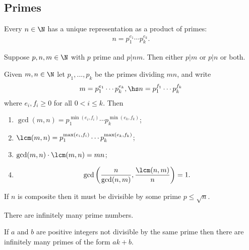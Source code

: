 \documentclass{article}
\begin{document}
\subsection{Primes}

\begin{theorem}
    Every $n\in\N$ has a unique representation as a product of primes:
    \begin{align*}
        n = p_1^{e_1}\cdots p_k^{e_k}.
    \end{align*}
\end{theorem}

\begin{proposition}[Boocher 2.3]
    Suppose $p,n,m\in\N$ with $p$ prime and $p|nm$. Then either $p|m$ or $p|n$ or both.
\end{proposition}

\begin{proposition}[Boocher 3.2]
    Given $m,n\in\N$ let $p_1,...,p_k$ be the primes dividing $mn$, and write 
    \begin{align*}
        m = p_1^{e_1}\cdots p_k^{e_k}, \hs n = p_1^{f_1}\cdots p_k^{f_k}
    \end{align*}
    where $e_i,f_i\geq 0$ for all $0<i\leq k$. Then 
    \begin{enumerate}
        \item $\gcd(m,n)=p_1^{\min(e_i,f_i)}\cdots p_k^{\min(e_k,f_k)}$;
        \item $\lcm(m,n)=p_1^{\max(e_i,f_i)}\cdots p_k^{\max(e_k,f_k)}$;
        \item $\gcd(m,n)\cdot\lcm(m,n)=mn$;
        \item \begin{align*}
            \gcd\left(\frac{n}{\gcd(n,m)},\frac{\lcm(n,m)}{n}\right)=1.
        \end{align*}
    \end{enumerate}
\end{proposition}

\begin{theorem}[Boocher 2.5]
    If $n$ is composite then it must be divisible by some prime $p\leq\sqrt{n}$. 
\end{theorem}

\begin{theorem}
    There are infinitely many prime numbers. 
\end{theorem}

\begin{theorem}
    If $a$ and $b$ are positive integers not divisible by the same prime then there are
    infinitely many primes of the form $ak+b$. 
\end{theorem}
\end{document}
